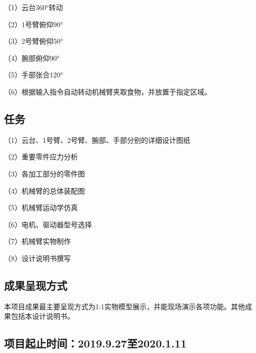 （1）云台360°转动

（2）1号臂俯仰90°

（3）2号臂俯仰50°

（4）腕部俯仰90°

（5）手部张合120°

（6）根据输入指令自动转动机械臂夹取食物，并放置于指定区域。
  


\subsection{任务}

（1）云台、1号臂、2号臂、腕部、手部分别的详细设计图纸

（2）重要零件应力分析

（3）各加工部分的零件图

（4）机械臂的总体装配图

（5）机械臂运动学仿真

（6）电机、驱动器型号选择

（7）机械臂实物制作

（8）设计说明书撰写

\subsection{成果呈现方式}
本项目成果最主要呈现方式为1:1实物模型展示，并能现场演示各项功能。其他成果包括本设计说明书。

\subsection{项目起止时间：2019.9.27至2020.1.11}




